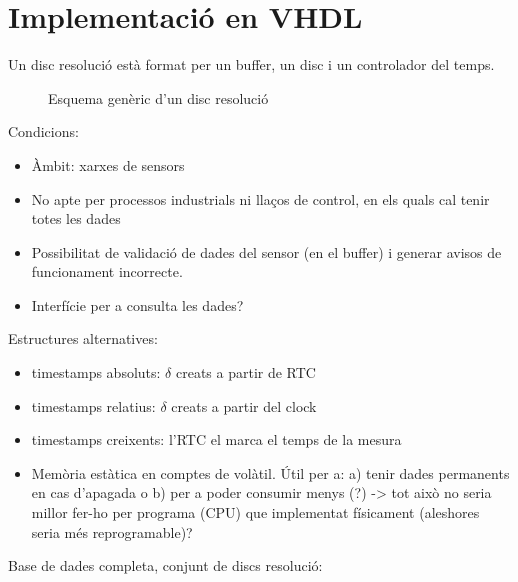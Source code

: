 \chapter{Implementació en VHDL}



Un disc resolució està format per un buffer, un disc i un controlador del temps.


\begin{figure}[htp]
\centering

\caption{Esquema genèric d'un disc resolució}
\label{fig:vhdl:disc-resolucio}
\end{figure}


Condicions:
\begin{itemize}
\item Àmbit: xarxes de sensors
\item No apte per processos industrials ni llaços de control, en els
  quals cal tenir totes les dades
\item Possibilitat de validació de dades del sensor (en el buffer) i
  generar avisos de funcionament incorrecte.
\item Interfície per a consulta les dades?
\end{itemize}





Estructures alternatives:
\begin{itemize}
\item timestamps absoluts: $\delta$ creats a partir de RTC
\item timestamps relatius: $\delta$ creats a partir del clock
\item timestamps creixents: l'RTC el marca el temps de la mesura
\item Memòria estàtica en comptes de volàtil. Útil per a: a) tenir dades permanents en cas d'apagada o b) per a poder consumir menys (?)   ->  tot això no seria millor fer-ho per programa (CPU) que implementat físicament (aleshores seria més reprogramable)?
\end{itemize}





Base de dades completa, conjunt de discs resolució:
\usetikzlibrary{shapes,arrows,positioning}

